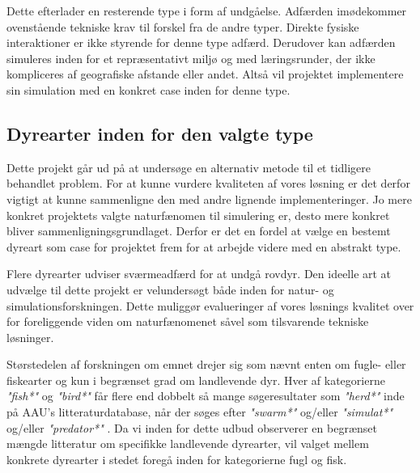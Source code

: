 \par
Dette efterlader en resterende type i form af undgåelse. Adfærden imødekommer ovenstående tekniske krav til forskel fra de andre typer. Direkte fysiske interaktioner er ikke styrende for denne type adfærd. Derudover kan adfærden simuleres inden for et repræsentativt miljø og med læringsrunder, der ikke kompliceres af geografiske afstande eller andet. Altså vil projektet implementere sin simulation med en konkret case inden for denne type. 



\subsection{Dyrearter inden for den valgte type}
Dette projekt går ud på at undersøge en alternativ metode til et tidligere behandlet problem. For at kunne vurdere kvaliteten af vores løsning er det derfor vigtigt at kunne sammenligne den med andre lignende implementeringer.
Jo mere konkret projektets valgte naturfænomen til simulering er, desto mere konkret bliver sammenligningsgrundlaget. Derfor er det en fordel at vælge en bestemt dyreart som case for projektet frem for at arbejde videre med en abstrakt type.
\par
Flere dyrearter udviser sværmeadfærd for at undgå rovdyr. Den ideelle art at udvælge til dette projekt er velundersøgt både inden for natur- og simulationsforskningen. Dette muliggør evalueringer af vores løsnings kvalitet over for foreliggende viden om naturfænomenet såvel som tilsvarende tekniske løsninger. 
\par
Størstedelen af forskningen om emnet drejer sig som nævnt enten om fugle- eller fiskearter og kun i begrænset grad om landlevende dyr. Hver af kategorierne \textit{"fish*"} og \textit{"bird*"} får flere end dobbelt så mange søgeresultater som \textit{"herd*"} inde på AAU's litteraturdatabase, når der søges efter \textit{"swarm*"} og/eller \textit{"simulat*"} og/eller \textit{"predator*"} \cite{AUB}. Da vi inden for dette udbud observerer en begrænset mængde litteratur om specifikke landlevende dyrearter, vil valget mellem konkrete dyrearter i stedet foregå inden for kategorierne fugl og fisk.


